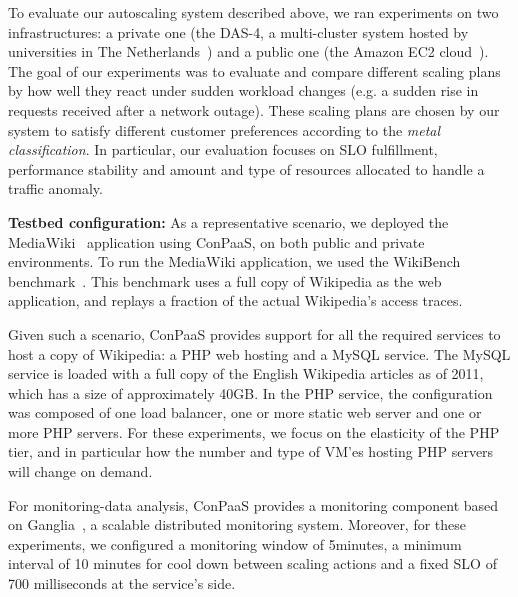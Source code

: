 
To evaluate our autoscaling system described above, we ran experiments
on two infrastructures: a private one (the DAS-4, a multi-cluster system
hosted by universities in The Netherlands~\cite{das4}) and a public
one (the Amazon EC2 cloud~\cite{amazonEC2}). The goal of our experiments
was to evaluate and compare different scaling plans by how well they react under sudden
workload changes (e.g. a sudden rise in requests received after a network outage). These scaling plans are chosen by our system to satisfy different customer preferences according to the \emph{metal classification}. In particular, our evaluation focuses on
SLO fulfillment, performance stability and amount and type of resources allocated to handle
a traffic anomaly. 



\textbf{Testbed configuration:}  As a representative scenario, we deployed the MediaWiki~\cite{mediawiki} application using ConPaaS, on both public and private environments. To run the MediaWiki application, we used the WikiBench benchmark~\cite{wikibench}. This benchmark uses a full copy of Wikipedia as the web application, and replays a fraction of the actual Wikipedia's access traces. 

Given such a scenario, ConPaaS provides support for all the required services to host a copy of Wikipedia: a PHP web hosting and a MySQL service. The MySQL service is loaded with a full copy of the English Wikipedia articles as of 2011, which has a size of approximately 40GB.  In the PHP service, the configuration was composed of one load balancer, one or more static web server and one or more PHP servers. For these experiments, we focus on the elasticity of the PHP tier, and in particular how the number and type of VM'es hosting PHP servers will change on demand.

For monitoring-data analysis, ConPaaS provides a monitoring component based on Ganglia~\cite{ganglia}, a scalable distributed monitoring system. Moreover, for these experiments, we configured a monitoring window of 5minutes, a minimum interval of 10 minutes for cool down between scaling actions and a fixed SLO of 700 milliseconds at the service's side.


